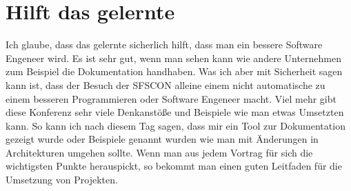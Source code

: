 \documentclass[10pt,ngerman]{scrartcl}
\begin{document}
\section*{Hilft das gelernte}
Ich glaube, dass das gelernte sicherlich hilft, dass man ein bessere Software Engeneer wird. Es ist sehr gut, wenn man sehen kann wie andere Unternehmen zum Beispiel die Dokumentation handhaben. Was ich aber mit Sicherheit sagen kann ist, dass der Besuch der SFSCON alleine einem nicht automatische zu einem besseren Programmieren oder Software Engeneer macht. Viel mehr gibt diese Konferenz sehr viele Denkanstöße und Beispiele wie man etwas Umsetzten kann. So kann ich nach diesem Tag sagen, dass mir ein Tool zur Dokumentation gezeigt wurde oder Beispiele genannt wurden wie man mit Änderungen in Architekturen umgehen sollte. Wenn man aus jedem Vortrag für sich die wichtigsten Punkte herauspickt, so bekommt man einen guten Leitfaden für die Umsetzung von Projekten.
\end{document}
